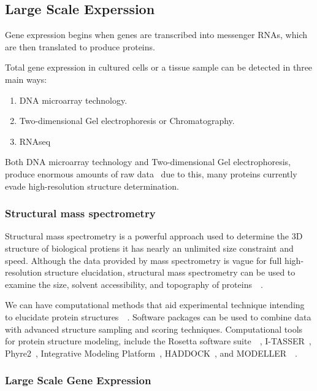 \documentclass[]{final_report}
\begin{document}
\subsection{Large Scale Experssion}

Gene expression begins when genes are transcribed into messenger RNAs, which are then translated to produce proteins. 

Total gene expression in cultured cells or a tissue sample can be detected in three main ways:

\begin{enumerate}
    \item DNA microarray technology.
    \item Two-dimensional Gel electrophoresis or Chromatography.
    \item RNAseq
\end{enumerate}

Both DNA microarray technology and Two-dimensional Gel electrophoresis, produce enormous amounts of raw data~\cite{zvelebil_understanding_2008} due to this, many proteins currently evade high-resolution structure determination.


\subsubsection{Structural mass spectrometry}
Structural mass spectrometry is a powerful approach used to determine the 3D structure of biological protiens it has nearly an unlimited size constraint and speed. Although the data provided by mass spectrometry is vague for full high-resolution structure elucidation, structural mass spectrometry can be used to examine the size, solvent accessibility, and topography of proteins~\cite{limpikirati_covalent_2018}~\cite{liu_mass_2020}.

We can have computational methods that aid experimental technique intending to elucidate protein structures~\cite{seffernick_hybrid_2020}~\cite{leman_macromolecular_2020}. Software packages can be used to combine data with advanced structure sampling and scoring techniques. Computational tools for protein structure modeling, include the Rosetta software suite~\cite{leman_macromolecular_2020}~\cite{alford_rosetta_2017}, I-TASSER~\cite{yang_i-tasser_2015}, Phyre2~\cite{kelley_phyre2_2015}, Integrative Modeling Platform~\cite{russel_putting_2012}, HADDOCK~\cite{dominguez_haddock_2003}, and MODELLER~\cite{eswar_comparative_2006}~\cite{biehn_protein_2022}.

\clearpage
\subsubsection{Large Scale Gene Expression}
\end{document}
